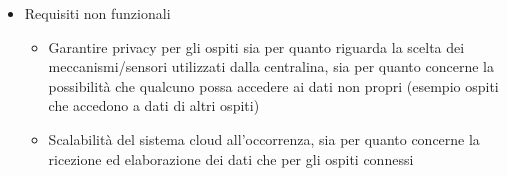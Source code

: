 \begin{itemize}
    \item Requisiti non funzionali
    \begin{itemize}
        \item Garantire privacy per gli ospiti sia per quanto riguarda la scelta dei meccanismi/sensori utilizzati dalla centralina, 
                sia per quanto concerne la possibilità che qualcuno possa accedere ai dati non propri (esempio ospiti che accedono a dati di altri ospiti)
        \item Scalabilità del sistema cloud all'occorrenza, sia per quanto concerne la ricezione ed elaborazione dei dati che per gli ospiti connessi
    \end{itemize}
\end{itemize}
%